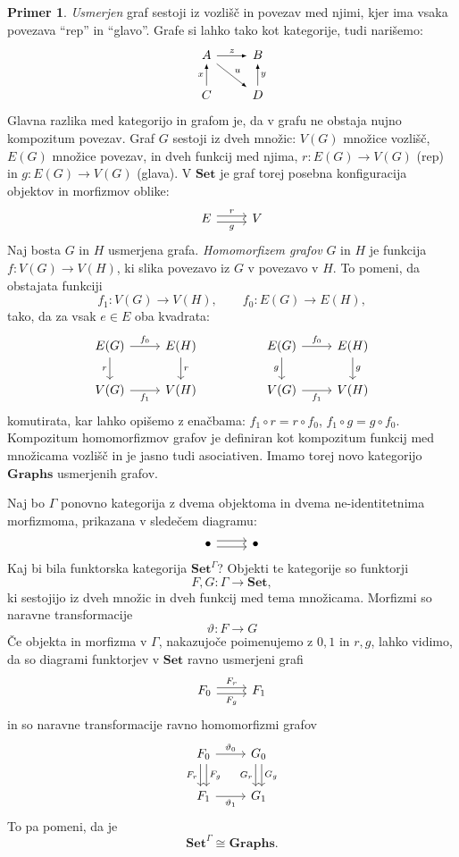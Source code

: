 \documentclass[12pt,a4paper]{book}
\theoremstyle{definition}
\theoremstyle{plain}
\theoremstyle{definition}
\newtheorem{primer}{Primer}[section]
\theoremstyle{remark}
\newcommand{\cat}[1]{\textbf{#1}}
\begin{document}
\begin{primer} \label{grafi}
\emph{Usmerjen} graf sestoji iz vozlišč in povezav med njimi, kjer ima vsaka povezava "`rep"' in "`glavo"'. Grafe si lahko tako kot kategorije, tudi narišemo:
%
$$
\begin{tikzcd}[arrow style=tikz, >=latex]
A \ar[r, "z"] \ar[rd, "u"] & B \\
C \ar[u, "x"] & D \ar[u, "y"']
\end{tikzcd}
$$
Glavna razlika med kategorijo in grafom je, da v grafu ne obstaja nujno kompozitum povezav.
Graf $G$ sestoji iz dveh množic: $V(G)$ množice vozlišč, $E(G)$ množice povezav, in dveh funkcij med njima, $r : E(G) \to V(G)$ (rep) in $g : E(G) \to V(G)$ (glava). V $\cat{Set}$ je graf torej posebna konfiguracija objektov in morfizmov oblike:
%
$$
\begin{tikzcd}
E \ar[r, shift left, "r"] \ar[r, shift right, "g"'] & V
\end{tikzcd}
$$
Naj bosta $G$ in $H$ usmerjena grafa. \emph{Homomorfizem grafov} $G$ in $H$ je funkcija $f : V(G) \to V(H)$, ki slika povezavo iz $G$ v povezavo v $H$. To pomeni, da obstajata funkciji 
$$f_1 : V(G) \to V(H), \qquad f_0 : E(G) \to E(H),$$
tako, da za vsak $e \in E$ oba kvadrata:
$$
\begin{tikzcd}
E(G) \ar[d, "r"'] \ar[r, "f_0"] & E(H) \ar[d, "r"] && E(G) \ar[d, "g"'] \ar[r, "f_0"] & E(H) \ar[d, "g"] \\
V(G) \ar[r, "f_1"'] & V(H) && V(G) \ar[r, "f_1"'] & V(H)
\end{tikzcd}
$$
komutirata, kar lahko opišemo z enačbama: $f_1 \circ r = r \circ f_0$, $f_1 \circ g = g \circ f_0$.
%
Kompozitum homomorfizmov grafov je definiran kot kompozitum funkcij med množicama vozlišč in je jasno tudi asociativen. Imamo torej novo kategorijo $\cat{Graphs}$ usmerjenih grafov.

Naj bo $\Gamma$ ponovno kategorija z dvema objektoma in dvema ne-identitetnima morfizmoma, prikazana v sledečem diagramu:
%
$$
\begin{tikzcd}
\bullet \ar[r, shift left] \ar[r, shift right] & \bullet
\end{tikzcd}
$$
%
Kaj bi bila funktorska kategorija $\cat{Set}^\Gamma$? Objekti te kategorije so funktorji 
$$F,G : \Gamma \to \cat{Set},$$
ki sestojijo iz dveh množic in dveh funkcij med tema množicama. Morfizmi so naravne transformacije
$$\vartheta : F \to G$$
Če objekta in morfizma v $\Gamma$, nakazujoče poimenujemo z $0,1$ in $r,g$, lahko vidimo, da so diagrami funktorjev v $\cat{Set}$ ravno usmerjeni grafi
$$
\begin{tikzcd}
F_0 \ar[r, shift left, "F_r"] \ar[r, shift right, "F_g"'] & F_1
\end{tikzcd}
$$
in so naravne transformacije ravno homomorfizmi grafov
%
$$
\begin{tikzcd}
F_0 \ar[r, "\vartheta_0"] \ar[d, shift left, "F_g"] \ar[d, shift right, "F_r"'] & G_0 \ar[d, shift left, "G_g"] \ar[d, shift right, "G_r"'] \\
F_1 \ar[r, "\vartheta_1"'] & G_1
\end{tikzcd}
$$
To pa pomeni, da je
$$\cat{Set}^\Gamma \cong \cat{Graphs}.$$

\end{primer}
\end{document}
